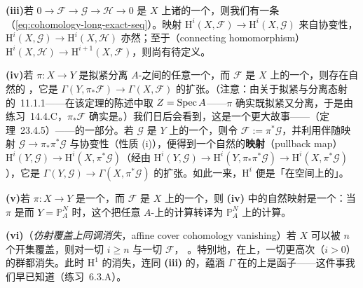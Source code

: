 \textbf{(iii)}\quad 若 $0\to\mathscr{F}\to\mathscr{G}\to\mathscr{H}\to 0$ 是 $X$ 上诸\trQCSheaf{}的一个\trShortExactSequence，则我们有一条 \fbox{\trLongExactSequence}（\eqref{eq:cohomology-long-exact-seq}）。映射
$\mathrm{H}^i(X,\mathscr{F})\to\mathrm{H}^i(X,\mathscr{G})$ 来自协变性，
$\mathrm{H}^i(X,\mathscr{G})\to\mathrm{H}^i(X,\mathscr{H})$ 亦然；至于\emph{\trConnectingHomomorphism}（connecting homomorphism）
$\mathrm{H}^i(X,\mathscr{H})\to\mathrm{H}^{i+1}(X,\mathscr{F})$，则尚有待定义。

\textbf{(iv)}\quad 若 $\pi\colon X\to Y$ 是拟紧分离 $A$-\trScheme{}之间的任意一个\trMorphism，而 $\mathscr{F}$ 是 $X$ 上的一个\trQCSheaf，则存在自然的\trMorphism{}
，它是
$\Gamma(Y,\pi_*\mathscr{F})\to\Gamma(X,\mathscr{F})$ 的扩张。（注意：由关于拟紧与分离态射的\trCancellationTheorem{}~11.1.1——在该定理的陈述中取 $Z=\operatorname{Spec} A$——$\pi$ 确实既拟紧又分离，于是由\mbox{练习~14.4.C}，$\pi_*\mathscr{F}$ 确实是\trQCSheaf。）我们日后会看到，这是一个更大故事——\emph{\trLeray\trSpectralSequence}（\mbox{定理~23.4.5}）——的一部分。若 $\mathscr{G}$ 是 $Y$ 上的一个\trQCSheaf，则令 $\mathscr{F}:=\pi^*\mathscr{G}$，并利用伴随映射
$\mathscr{G}\to\pi_*\pi^*\mathscr{G}$ 与协变性（性质 (i)），便得到一个自然的\textbf{\trPullback{}映射}（pullback map）
$\mathrm{H}^i(Y,\mathscr{G})\to\mathrm{H}^i(X,\pi^*\mathscr{G})$（经由
$\mathrm{H}^i(Y,\mathscr{G})\to\mathrm{H}^i(Y,\pi_*\pi^*\mathscr{G})\to\mathrm{H}^i(X,\pi^*\mathscr{G})$），它是
$\Gamma(Y,\mathscr{G})\to\Gamma(X,\pi^*\mathscr{G})$ 的扩张。如此一来，$\mathrm{H}^i$ 便是「在空间上的\trContravariantFunctor」。

\textbf{(v)}\quad 若 $\pi\colon X\to Y$ 是一个\trAffine\trMorphism，而 $\mathscr{F}$ 是 $X$ 上的一个\trQCSheaf，则 \textbf{(iv)} 中的自然映射是一个\trIsomorphism：当 $\pi$ 是\trClosedEmbedding{}而 $Y=\mathbb{P}^N_A$ 时，这个\trIsomorphism{}把任意\trProjective{} $A$-\trScheme{}上的计算转译为 $\mathbb{P}^N_A$ 上的计算。

\textbf{(vi)}\quad（\emph{仿射覆盖上同调消失}，affine cover cohomology vanishing）若 $X$ 可以被 $n$ 个\trAffine{}开集覆盖，则对一切 $i\ge n$ 与一切 $\mathscr{F}$，
。特别地，在\trAffine\trScheme{}上，一切更高次（$i>0$）的\trQC{}\trCohomology{}群都消失。此时 $\mathrm{H}^1$ 的消失，连同 \textbf{(iii)} 的\trLongExactSequence，蕴涵 $\Gamma$ 在\trAffine\trScheme{}的\trQCSheaf{}上是\trExact{}函子——这件事我们早已知道（\mbox{练习~6.3.A}）。


